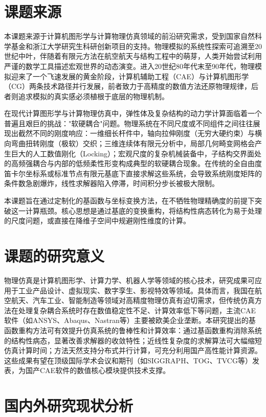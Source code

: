 
\section{课题来源}

本课题来源于计算机图形学与计算物理仿真领域的前沿研究需求，受到国家自然科学基金和浙江大学研究生科研创新项目的支持。物理模拟的系统性探索可追溯至20世纪中叶，伴随着有限元方法在航空航天与结构工程中的萌芽，人类开始尝试利用严谨的数学工具描述宏观世界的动态演变。进入20世纪80年代末至90年代，物理模拟迎来了一个飞速发展的黄金阶段，计算机辅助工程（CAE）与计算机图形学（CG）两条技术路径并行发展，前者致力于高精度的数值方法还原物理规律，后者则追求模拟的真实感必须植根于底层的物理机制。

在现代计算图形学与计算物理仿真中，弹性体及复杂结构的动力学计算面临着一个普遍且艰巨的挑战："软硬耦合"问题。物理系统在不同尺度或不同组件之间往往展现出截然不同的刚度响应：一维细长杆件中，轴向拉伸刚度（无穷大硬约束）与横向弯曲扭转刚度（极软）交织；三维连续体有限元分析中，局部几何畸变网格会产生巨大的人工数值刚化（Locking）；宏观尺度的复杂机械装备中，子结构交界面处的高频强耦合与内部的低频柔性形变构成典型的软硬耦合现象。在传统的全自由度笛卡尔坐标系或标准节点有限元基底下直接求解这些系统，会导致系统刚度矩阵的条件数急剧爆炸，线性求解器陷入停滞，时间积分步长被极大限制。

本课题旨在通过定制化的基函数与坐标变换方法，在不牺牲物理精确度的前提下突破这一计算瓶颈。核心思想是通过基底的变换重构，将结构性病态转化为易于处理的尺度问题，或直接在降维子空间中规避刚性维度的计算。

\section{课题的研究意义}

物理仿真是计算机图形学、计算力学、机器人学等领域的核心技术，研究成果可应用于工业产品设计、虚拟现实、数字孪生、影视特效等领域。具体而言，我国在航空航天、汽车工业、智能制造等领域对高精度物理仿真有迫切需求，但传统仿真方法在处理复杂耦合系统时存在数值稳定性不足、计算效率低下等问题，主流CAE软件（如ANSYS、Abaqus、Nastran等）主要被欧美企业垄断。本研究提出的基函数重构方法可有效提升仿真系统的鲁棒性和计算效率：通过基函数重构消除系统的结构性病态，显著改善求解器的收敛特性；近线性复杂度的求解算法可大幅缩短仿真计算时间；方法天然支持分布式并行计算，可充分利用国产高性能计算资源。这些成果有望在顶级国际学术会议和期刊（如SIGGRAPH、TOG、TVCG等）发表，为国产CAE软件的数值核心模块提供技术支撑。

\section{国内外研究现状分析}

